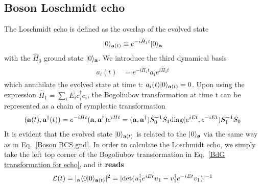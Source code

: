 \subsection{Boson Loschmidt echo}
\label{app: Boson Loschmidt echo}

The Loschmidt echo is defined as the overlap of the evolved state
\begin{eqnarray}\begin{aligned}
|0\rangle_{{\bf a}(t)}\equiv e^{-i\hat{H}_1t}|0\rangle_{\bf a}
\end{aligned}\end{eqnarray}
with the $\hat{H}_0$ ground state $|0\rangle_{\bf a}$. We introduce the third dynamical basis
\begin{eqnarray}\begin{aligned}
a_i(t)&=e^{-i\hat{H}_1t}a_ie^{i\hat{H}_1t}
\end{aligned}\end{eqnarray}
which annihilate the evolved state at time t: $a_i(t)|0\rangle_{{\bf a}(t)}=0$. Upon using the expression $\hat{H}_1=\sum_iE_ic_i^\dagger c_i$, the Bogoliubov transformation at time t can be represented as a chain of symplectic transformation
\begin{eqnarray}\begin{aligned}
\label{BdG transformation for echo}
({\bf a}(t),{\bf a}^\dagger(t))=e^{-iHt}
({\bf a} , {\bf a}^\dagger)e^{iHt}=({\bf a},{\bf a}^\dagger)S_0^{-1}S_1\text{diag}(e^{iEt},e^{-iEt})S_1^{-1}S_0
\end{aligned}\end{eqnarray}
It is evident that the evolved state $|0\rangle_{{\bf a}(t)}$ is related to the $|0\rangle_{{\bf a}}$ via the same way as in Eq.~\eqref{Boson BCS gnd}. In order to calculate the Loschmidt echo, we simply take the left top corner of the Bogoliubov transformation in Eq.~\eqref{BdG transformation for echo}, and it {\bf\color{red}reads}
\begin{eqnarray}\begin{aligned}
\label{eq in app: Echo}
\mathcal{L}(t)=|_{\bf a}\langle0|0\rangle_{{\bf a}(t)}|^2=|\text{det}(u_1^\dagger e^{iEt}u_1-v_1^\dagger e^{-iEt}v_1)|^{-1}
\end{aligned}\end{eqnarray}

